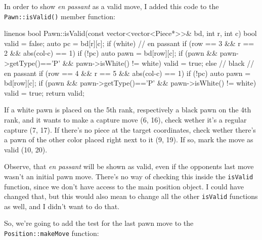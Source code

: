 In order to show \emph{en passant} as a valid move, I added this code to the
\texttt{Pawn::isValid()} member function:

\begin{cpp*}{linenos}
bool Pawn::isValid(const vector<vector<Piece*>>& bd, int r, int c) {
  bool valid = false;
  auto pc = bd[r][c];
  if (white) {
    // en passant
    if (row == 3 && r == 2 && abs(col-c) == 1) {
      if (!pc) {
        auto pawn = bd[row][c];
        if (pawn && pawn->getType()=='P' && pawn->isWhite() != white) {
          valid = true;
        }
      }
    }
  } else { // black
    // en passant
    if (row == 4 && r == 5 && abs(col-c) == 1) {
      if (!pc) {
        auto pawn = bd[row][c];
        if (pawn && pawn->getType()=='P' && pawn->isWhite() != white) {
          valid = true;
        }
      }
    }
  }
  return valid;
}
\end{cpp*}

If a white pawn is placed on the 5th rank, respectively a black pawn on the 4th rank,
and it wants to make a capture move (6, 16), check wether it's a regular capture (7, 17).
If there's no piece at the target coordinates, check wether there's a pawn of the other color
placed right next to it (9, 19).
If so, mark the move as valid (10, 20).

Observe, that \emph{en passant} will be shown as valid, even if the opponents last move wasn't an
initial pawn move.
There's no way of checking this inside the \texttt{isValid} function, since we don't have access to
the main position object.
I could have changed that, but this would also mean to change all the other \texttt{isValid} functions
as well, and I didn't want to do that.

So, we're going to add the test for the last pawn move to the \texttt{Position::makeMove}
function:

